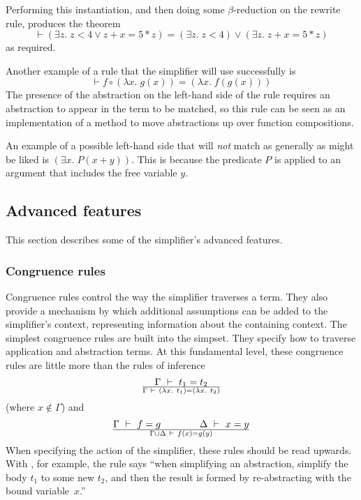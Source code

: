 {Performing this instantiation, and then doing some $\beta$-reduction
on the rewrite rule, produces the theorem\[
\vdash (\exists z. \;z < 4 \lor z + x = 5 * z) =
(\exists z. \;z < 4) \lor (\exists z.\;z + x = 5 * z)
\]
as required.

Another example of a rule that the simplifier will use successfully is
\[
\vdash f \circ (\lambda x.\; g(x)) = (\lambda x.\;f(g(x)))
\]
The presence of the abstraction on the left-hand side of the rule
requires an abstraction to appear in the term to be matched, so this
rule can be seen as an implementation of a method to move abstractions
up over function compositions.

An example of a possible left-hand side that will \emph{not} match as
generally as might be liked is $(\exists x.\;P(x + y))$.  This is
because the predicate $P$ is applied to an argument that includes the
free variable $y$.

\subsection{Advanced features}
\label{sec:advanced-simplifier}

This section describes some of the simplifier's advanced features.

\subsubsection{Congruence rules}
\label{sec:simp-congruences}

Congruence rules control the way the simplifier traverses a term.
They also provide a mechanism by which additional assumptions can be
added to the simplifier's context, representing information about the
containing context.  The simplest congruence rules are built into the
 simpset.  They specify how to traverse application and
abstraction terms.  At this fundamental level, these congruence rules
are little more than the rules of inference 
\[
\Gamma \ \vdash\  t_1 = t_2
\over
\Gamma \ \vdash\  (\lambda x.\ t_1) = (\lambda x.\ t_2)
\]
(where $x\not\in\Gamma$) and 
\[
\Gamma \ \vdash\  f = g \qquad \qquad \Delta \ \vdash\  x = y
\over
\Gamma \cup \Delta \ \vdash\  f(x) = g(y)
\]
When specifying the action of the simplifier, these rules should be
read upwards.  With , for example, the rule says ``when
simplifying an abstraction, simplify the body $t_1$ to some new $t_2$,
and then the result is formed by re-abstracting with the bound
variable~$x$.''

}
